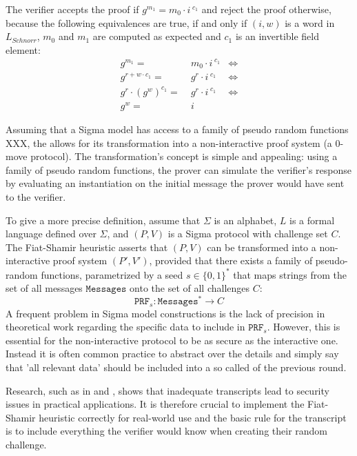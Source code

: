 \begin{example}
The verifier accepts the proof if $g^{m_1} = m_0\cdot i^{\;c_1}$ and reject the proof otherwise, because the following equivalences are true, if and only if $(i,w)$ is a word in $L_{Schnorr}$, $m_0$ and $m_1$ are computed as expected and $c_1$ is an invertible field element:
\begin{align*}
g^{m_1} =\; & m_0\cdot i^{\;c_1} & \Leftrightarrow\\
g^{r+w\cdot c_1} =\; & g^{r} \cdot i^{\;c_1} &\Leftrightarrow \\
g^r \cdot (g^w)^{c_1} =\; & g^{r} \cdot i^{\;c_1} & \Leftrightarrow \\
g^w =\; & i
\end{align*}
\end{example}
Assuming that a Sigma model has access to a family of pseudo random functions XXX, the  allows for its transformation into a non-interactive proof system (a $0$-move protocol). The transformation's concept is simple and appealing: using a family of pseudo random functions, the prover can simulate the verifier's response by evaluating an instantiation on the initial message the prover would have sent to the verifier.

To give a more precise definition, assume that $\Sigma$ is an alphabet, $L$ is a formal language defined over $\Sigma$, and $(P,V)$ is a Sigma protocol with challenge set $C$. The Fiat-Shamir heuristic asserts that $(P,V)$ can be transformed into a non-interactive proof system $(P',V')$, provided that there exists a family of pseudo-random functions, parametrized by a seed $s\in\{0,1\}^*$ that maps strings from the set of all messages $\mathtt{Messages}$ onto the set of all challenges $C$:
\begin{equation}
\mathtt{PRF}_s: \mathtt{Messages}^* \to C    
\end{equation}
A frequent problem in Sigma model constructions is the lack of precision in theoretical work regarding the specific data to include in $\mathtt{PRF}_s$. However, this is essential for the non-interactive protocol to be as secure as the interactive one. Instead it is often common practice to abstract over the details and simply say that 'all relevant data' should be included into a so called   of the previous round.

Research, such as in \cite{dao-23} and \cite{bernhard-16}, shows that inadequate transcripts lead to security issues in practical applications. It is therefore crucial to implement the Fiat-Shamir heuristic correctly for real-world use and the basic rule for the transcript is to include everything the verifier would know when creating their random challenge.

